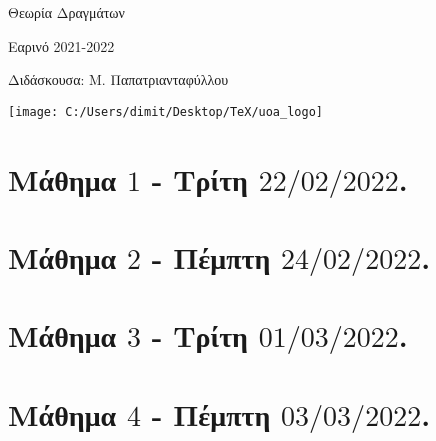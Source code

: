 \documentclass[oneside,a4paper]{article}
\begin{document}
	
	
	\begin{framed}	
		\begin{center}
			\huge Θεωρία Δραγμάτων
		\end{center}
		\begin{center}
			 Εαρινό 2021-2022
		\end{center}
		\vspace{0.3truecm}
		\begin{center}
			Διδάσκουσα: Μ. Παπατριανταφύλλου
		\end{center}
		\vspace{0.3truecm}
	\end{framed}
	\vspace*{\fill}
	\begin{center}
	\texttt{[image: C:/Users/dimit/Desktop/TeX/uoa\_logo]}
	\end{center}
\vspace{1cm}
\pagebreak

\section*{Μάθημα $1$ - Τρίτη $22/02/2022$.}
\vspace{0.3truecm}


\pagebreak


\section*{Μάθημα $2$ - Πέμπτη $24/02/2022$.}
\vspace{0.3truecm}


\pagebreak

\section*{Μάθημα $3$ - Τρίτη $01/03/2022$.}
\vspace{0.3truecm}


\pagebreak

\section*{Μάθημα $4$ - Πέμπτη $03/03/2022$.}
\vspace{0.3truecm}


\pagebreak
\end{document}
